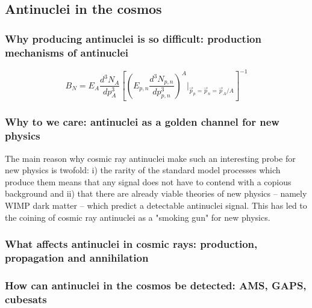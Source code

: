\subsection{Antinuclei in the cosmos}

\subsubsection{ Why producing antinuclei is so difficult: production mechanisms of antinuclei}\label{sec:IntroProductionAntinuclei}
\begin{equation}\label{eq:CoalescenceParameter}
    B_N = E_A \frac{d^3 N_A}{dp^3_A} \left[ \left( E_{p,n} \frac{d^3 N_{p,n}}{dp^3_{p,n}} \right)^A |_{\vec{p}_p=\vec{p}_n=\vec{p}_A/A } \right]^{-1}
\end{equation}
\subsubsection{ Why to we care: antinuclei as a golden channel for new physics}\label{sec:Intro:AntinucleiGoldenChannel}
The main reason why cosmic ray antinuclei make such an interesting probe for new physics is twofold: i) the rarity of the standard model processes which produce them means that any signal does not have to contend with a copious background and ii) that there are already viable theories of new physics -- namely WIMP dark matter -- which predict a detectable antinuclei signal. This has led to the coining of cosmic ray antinuclei as a "smoking gun" for new physics. 

\subsubsection{ What affects antinuclei in cosmic rays: production, propagation and annihilation}
\subsubsection{ How can antinuclei in the cosmos be detected: AMS, GAPS, cubesats}
